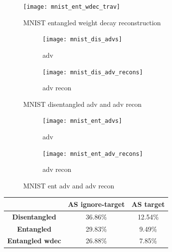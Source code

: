 \documentclass{report}
\begin{document}
\begin{figure}
\begin{center}
\texttt{[image: mnist\_ent\_wdec\_trav]}
\end{center}
\caption{MNIST entangled weight decay reconstruction}
\end{figure}

\begin{figure}
\begin{subfigure}{.5\textwidth}
  \centering
  \texttt{[image: mnist\_dis\_advs]}
  \caption{adv}
\end{subfigure}%
\begin{subfigure}{.5\textwidth}
  \centering
  \texttt{[image: mnist\_dis\_adv\_recons]}
  \caption{adv recon}
\end{subfigure}
\caption{MNIST disentangled adv and adv recon}
\label{fig:mnist-dis-advs}
\end{figure}

\begin{figure}
\begin{subfigure}{.5\textwidth}
  \centering
  \texttt{[image: mnist\_ent\_advs]}
  \caption{adv}
\end{subfigure}%
\begin{subfigure}{.5\textwidth}
  \centering
  \texttt{[image: mnist\_ent\_adv\_recons]}
  \caption{adv recon}
\end{subfigure}
\caption{MNIST ent adv and adv recon}
\label{fig:mnist-ent-advs}
\end{figure}

\begin{center}
  \begin{tabular}{|c|c|c|}
  \hline
   & \textbf{AS ignore-target} & \textbf{AS target} \\ \hline
  \textbf{Disentangled} & 36.86\% & 12.54\% \\ \hline
  \textbf{Entangled} & 29.83\% & 9.49\% \\ \hline
  \textbf{Entangled wdec} & 26.88\% & 7.85\% \\ \hline
  \end{tabular}
\end{center}
\end{document}
